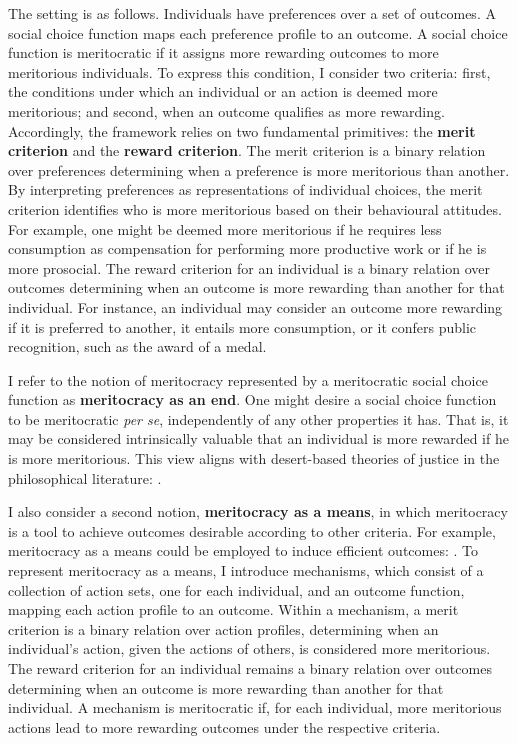 The setting is as follows. Individuals have preferences over a set of outcomes. A social choice function maps each preference profile to an outcome. A social choice function is meritocratic if it assigns more rewarding outcomes to more meritorious individuals. To express this condition, I consider two criteria: first, the conditions under which an individual or an action is deemed more meritorious; and second, when an outcome qualifies as more rewarding. Accordingly, the framework relies on two fundamental primitives: the \textbf{merit criterion} and the \textbf{reward criterion}. The merit criterion is a binary relation over preferences determining when a preference is more meritorious than another. By interpreting preferences as representations of individual choices, the merit criterion identifies who is more meritorious based on their behavioural attitudes. For example, one might be deemed more meritorious if he requires less consumption as compensation for performing more productive work or if he is more prosocial. The reward criterion for an individual is a binary relation over outcomes determining when an outcome is more rewarding than another for that individual. For instance, an individual may consider an outcome more rewarding if it is preferred to another, it entails more consumption, or it confers public recognition, such as the award of a medal.

I refer to the notion of meritocracy represented by a meritocratic social choice function as \textbf{meritocracy as an end}. One might desire a social choice function to be meritocratic \emph{per se}, independently of any other properties it has. That is, it may be considered intrinsically valuable that an individual is more rewarded if he is more meritorious. This view aligns with desert-based theories of justice in the philosophical literature:  \citep[p. 5]{kaganGeometryDesert2014}.

I also consider a second notion, \textbf{meritocracy as a means}, in which meritocracy is a tool to achieve outcomes desirable according to other criteria. For example, meritocracy as a means could be employed to induce efficient outcomes:  \citep[p. 1]{morganLimitsMeritocracy2022}. To represent meritocracy as a means, I introduce mechanisms, which consist of a collection of action sets, one for each individual, and an outcome function, mapping each action profile to an outcome. Within a mechanism, a merit criterion is a binary relation over action profiles, determining when an individual's action, given the actions of others, is considered more meritorious. The reward criterion for an individual remains a binary relation over outcomes determining when an outcome is more rewarding than another for that individual. A mechanism is meritocratic if, for each individual, more meritorious actions lead to more rewarding outcomes under the respective criteria.

